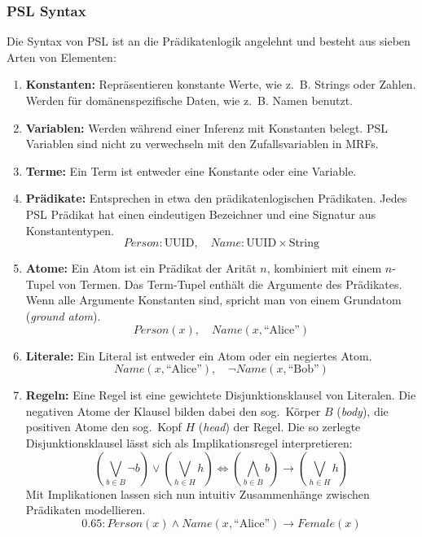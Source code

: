 \subsubsection{PSL Syntax}
Die Syntax von PSL ist an die Prädikatenlogik angelehnt und besteht aus sieben Arten von Elementen:
\begin{enumerate}
	\item \textbf{Konstanten:}
		Repräsentieren konstante Werte, wie z.~B. Strings oder Zahlen.
		Werden für domänenspezifische Daten, wie z.~B. Namen benutzt.
	\item \textbf{Variablen:}
		Werden während einer Inferenz mit Konstanten belegt.
		PSL Variablen sind nicht zu verwechseln mit den Zufallsvariablen in MRFs.
	\item \textbf{Terme:}
		Ein Term ist entweder eine Konstante oder eine Variable.
	\item \textbf{Prädikate:}
		Entsprechen in etwa den prädikatenlogischen Prädikaten.
		Jedes PSL Prädikat hat einen eindeutigen Bezeichner und eine Signatur aus Konstantentypen.
		\[Person: \text{UUID},\quad Name: \text{UUID} \times \text{String}\]
	\item \textbf{Atome:}
		Ein Atom ist ein Prädikat der Arität $n$, kombiniert mit einem $n$-Tupel von Termen.
		Das Term-Tupel enthält die Argumente des Prädikates.
		Wenn alle Argumente Konstanten sind, spricht man von einem Grundatom (\textit{ground atom}). \\
		\[Person(x),\quad Name(x, \text{``Alice''})\] %
	\item \textbf{Literale:}
		Ein Literal ist entweder ein Atom oder ein negiertes Atom. \\
		\[Name(x, \text{``Alice''}),\quad \lnot Name(x, \text{``Bob''})\] %
	\item \textbf{Regeln:}
		Eine Regel ist eine gewichtete Disjunktionsklausel von Literalen.
		Die negativen Atome der Klausel bilden dabei den sog.\ Körper $B$ (\textit{body}), die positiven Atome den sog.\ Kopf $H$ (\textit{head}) der Regel.
		Die so zerlegte Disjunktionsklausel lässt sich als Implikationsregel interpretieren:
		\[
			\left(\bigvee_{b \in B} \lnot b\right) \lor \left(\bigvee_{h \in H} h\right) \Leftrightarrow \left(\bigwedge_{b \in B}  b\right) \rightarrow \left(\bigvee_{h \in H} h\right)
		\]
		Mit Implikationen lassen sich nun intuitiv Zusammenhänge zwischen Prädikaten modellieren.\\
		\[0.65: Person(x) \land Name(x, \text{``Alice''}) \rightarrow Female(x)\] %
\end{enumerate}

